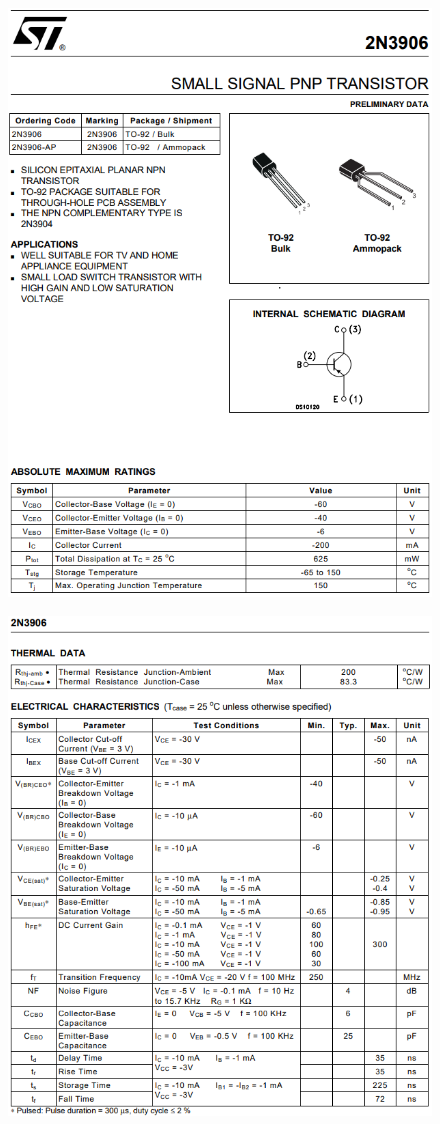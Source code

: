 \begin{figure}[h]
    \centering
    \includegraphics[width=0.9\linewidth]{Appendices/2N3906_1.png}
    \label{2N3906_1}
\end{figure}
\begin{figure}[h]
    \centering
    \includegraphics[width=0.9\linewidth]{Appendices/2N3906_2.png}
    \label{2N3906_2}
\end{figure}
\FloatBarrier

